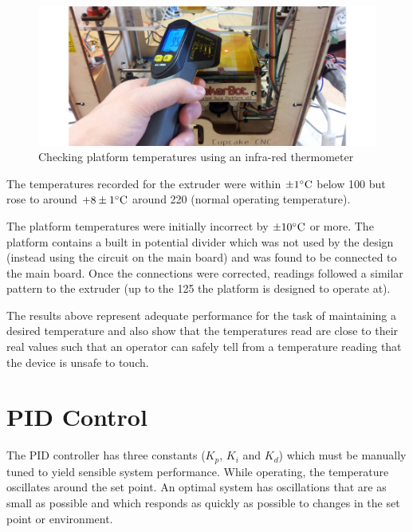 		\begin{figure}
			\includegraphics[width=1\textwidth]{diagrams/thermometer.pdf}
			\caption{Checking platform temperatures using an infra-red thermometer}
			\label{fig:thermometer}
		\end{figure}
		
		The temperatures recorded for the extruder were within $\pm1^\circ\textrm{C}$ below
		100\dC{} but rose to around $+8\pm1^\circ\textrm{C}$ around 220\dC{} (normal operating
		temperature).
		
		The platform temperatures were initially incorrect by $\pm10^\circ\textrm{C}$ or more.
		The platform contains a built in potential divider which was not used by the
		design (instead using the circuit on the main board) and was found to be
		connected to the main board. Once the connections were corrected, readings
		followed a similar pattern to the extruder (up to the 125\dC{} the platform
		is designed to operate at).
		
		The results above represent adequate performance for the task of maintaining
		a desired temperature and also show that the temperatures read are close to
		their real values such that an operator can safely tell from a temperature
		reading that the device is unsafe to touch.
	
	\section{PID Control}
		
		
		\label{sec:pidtraning}
		
		The PID controller has three constants ($K_p$, $K_i$ and $K_d$) which must
		be manually tuned to yield sensible system performance. While operating, the
		temperature oscillates around the set point. An optimal system has
		oscillations that are as small as possible and which responds as quickly as
		possible to changes in the set point or environment.
		
